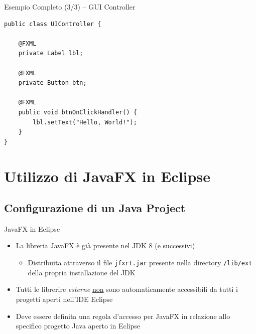 \documentclass[presentation]{beamer}
\begin{document}
\begin{frame}[fragile]{Esempio Completo (3/3) -- GUI Controller}
\begin{lstlisting}
public class UIController {

	@FXML
	private Label lbl;
	
	@FXML
	private Button btn;
	
	@FXML
	public void btnOnClickHandler() {
		lbl.setText("Hello, World!");
	}
}
\end{lstlisting}
\end{frame}

\section{Utilizzo di JavaFX in Eclipse}

\subsection{Configurazione di un Java Project}

\begin{frame}{JavaFX in Eclipse}
\begin{itemize}\itemsep20pt
\item La libreria JavaFX è già presente nel JDK 8 (e successivi)
\begin{itemize}
\item Distribuita attraverso il file \texttt{jfxrt.jar} presente nella directory \texttt{/lib/ext} della propria installazione del JDK
\end{itemize}
\item Tutti le librerire \emph{esterne} \underline{non} sono automaticamente accessibili da tutti i progetti aperti nell'IDE Eclipse 
\item Deve essere definita una regola d'accesso per JavaFX in relazione allo specifico progetto Java aperto in Eclipse
\end{itemize}
\end{frame}
\end{document}
